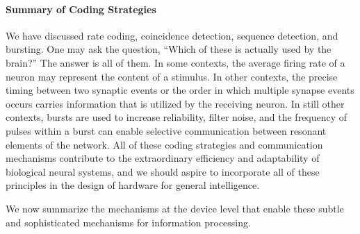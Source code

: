 \paragraph{\label{sec:coding_strategies_summary}Summary of Coding Strategies}
We have discussed rate coding, coincidence detection, sequence detection, and bursting. One may ask the question, ``Which of these is actually used by the brain?'' The answer is all of them. In some contexts, the average firing rate of a neuron may represent the content of a stimulus. In other contexts, the precise timing between two synaptic events or the order in which multiple synapse events occurs carries information that is utilized by the receiving neuron. In still other contexts, bursts are used to increase reliability, filter noise, and the frequency of pulses within a burst can enable selective communication between resonant elements of the network. All of these coding strategies and communication mechanisms contribute to the extraordinary efficiency and adaptability of biological neural systems, and we should aspire to incorporate all of these principles in the design of hardware for general intelligence. 

We now summarize the mechanisms at the device level that enable these subtle and sophisticated mechanisms for information processing.

